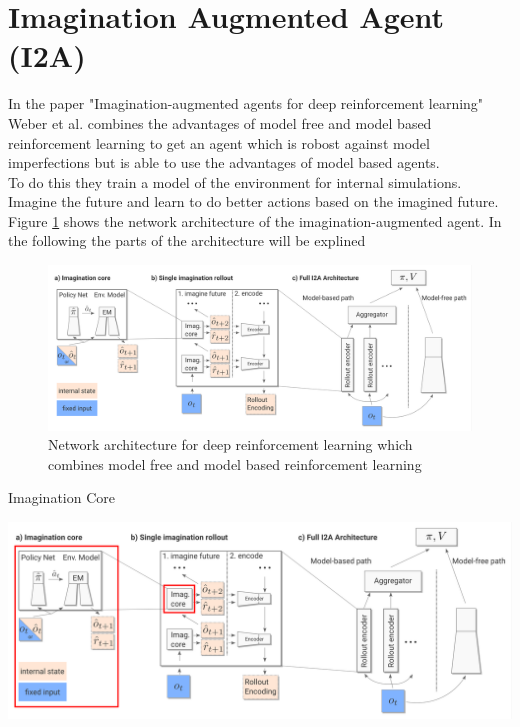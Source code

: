 \section{Imagination Augmented Agent (I2A)} 
\label{sec:i2a} 
 
In the paper "Imagination-augmented agents for deep reinforcement learning" Weber et al. \cite{I2A} combines the advantages of model free and model based reinforcement learning to get an agent which is robost against model imperfections but is able to use the advantages of model based agents.\\ 
 
To do this they train a model of the environment for internal simulations. 
Imagine the future and learn to do better actions based on the imagined future.\\ 
 
Figure \ref{fig:i2a_architecture} shows the network architecture of the imagination-augmented agent. In the following the parts of the architecture will be explined 
 
\begin{figure}[H] 
  \centering 
   
  \includegraphics[width=\columnwidth]{./Images/i2a_architecture.png} 
  \caption{Network architecture for deep reinforcement learning which combines model free and model based reinforcement learning} 
  \label{fig:i2a_architecture} 
\end{figure} 
 
 
 
Imagination Core 
 
\includegraphics[width=\columnwidth]{./Images/i2a_all_imagination_core.png}%
 
